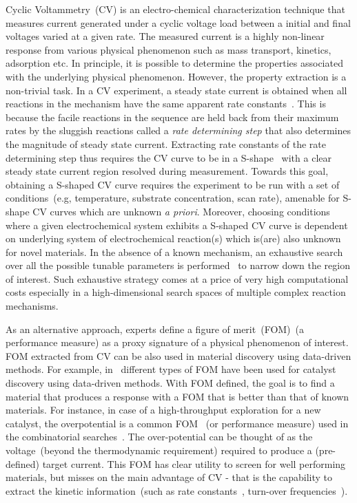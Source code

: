 Cyclic Voltammetry~(CV) is an electro-chemical characterization technique that measures current generated under a cyclic voltage load between a initial and final voltages varied at a given rate.
The measured current is a highly non-linear response from various physical phenomenon such as mass transport, kinetics, adsorption etc. 
In principle, it is possible to determine the properties associated with the underlying physical phenomenon. 
However, the property extraction is a non-trivial task. 
In a CV experiment, a steady state current is obtained when all reactions in the mechanism have the same apparent rate constants~\cite{BardFaulkner}. 
This is because the facile reactions in the sequence are held back from their maximum rates by the sluggish reactions called a \textit{rate determining step} that also determines the magnitude of steady state current.   
Extracting rate constants of the rate determining step thus requires the CV curve to be in a S-shape~\cite{costentin2015cyclic, rountree2014evaluation} with a clear steady state current region resolved during measurement. 
Towards this goal, obtaining a S-shaped CV curve requires the experiment to be run with a set of conditions~(e.g, temperature, substrate concentration, scan rate), amenable for S-shape CV curves which are unknown \textit{a priori}.
Moreover, choosing conditions where a given electrochemical system exhibits a S-shaped CV curve is dependent on underlying system of electrochemical reaction(s) which is(are) also unknown for novel materials. 
In the absence of a known mechanism, an exhaustive search over all the possible tunable parameters is performed~\cite{martin2016qualitative} to narrow down the region of interest. 
Such exhaustive strategy comes at a price of very high computational costs especially in a high-dimensional search spaces of multiple complex reaction mechanisms.

As an alternative approach, experts define a figure of merit~(FOM)~\cite{rountree2014evaluation}(a performance measure) as a proxy signature of a physical phenomenon of interest. 
FOM extracted from CV can be also used in material discovery using data-driven methods. 
For example, in~\cite{stein2019functional,li2019application,haber2014high,suram2015generating} different types of FOM have been used for catalyst discovery using data-driven methods.
With FOM defined, the goal is to find a material that produces a response with a FOM that is better than that of known materials.
For instance, in case of a high-throughput exploration for a new catalyst, the overpotential is a common FOM~\cite{norskov2004origin} (or performance measure) used in the combinatorial searches~\cite{suram2015generating}. 
The over-potential can be thought of as the voltage~(beyond the thermodynamic requirement) required to produce a (pre-defined) target current.
This FOM has clear utility to screen for well performing materials, but misses on the main advantage of CV - that is the capability to extract the kinetic information~(such as rate constants~\cite{FOWA}, turn-over frequencies~\cite{TOF,FOWA2}).

